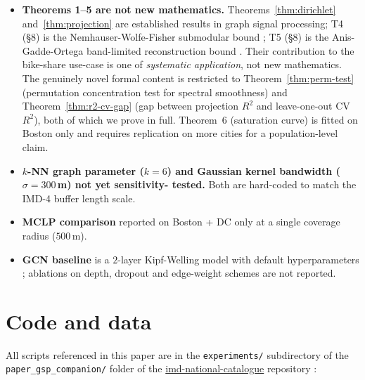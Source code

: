 \documentclass[11pt,a4paper]{article}
\newcommand{\1}{\mathbb{1}}
\theoremstyle{plain}
\theoremstyle{definition}
\theoremstyle{remark}
\begin{document}
\begin{itemize}[label=$\bullet$,leftmargin=*]
\item \textbf{Theorems 1--5 are not new mathematics.}
      Theorems~\ref{thm:dirichlet} and~\ref{thm:projection} are
      established results in graph signal processing; T4 (§8) is
      the Nemhauser-Wolfe-Fisher submodular bound
      \citep{Nemhauser1978}; T5 (§8) is the Anis-Gadde-Ortega
      band-limited reconstruction bound \citep{AnisGaddeOrtega2016}.
      Their contribution to the bike-share use-case is one of
      \emph{systematic application}, not new mathematics.  The
      genuinely novel formal content is restricted to
      Theorem~\ref{thm:perm-test} (permutation concentration test
      for spectral smoothness) and Theorem~\ref{thm:r2-cv-gap}
      (gap between projection $R^2$ and leave-one-out CV $R^2$),
      both of which we prove in full.  Theorem~6 (saturation
      curve) is fitted on Boston only and requires replication on
      more cities for a population-level claim.
\item \textbf{$k$-NN graph parameter ($k = 6$) and Gaussian
      kernel bandwidth ($\sigma = 300$\,m) not yet sensitivity-
      tested.}  Both are hard-coded to match the IMD-4 buffer
      length scale.
\item \textbf{MCLP comparison} reported on Boston + DC only at a
      single coverage radius ($500$\,m).
\item \textbf{GCN baseline} is a $2$-layer Kipf-Welling model
      with default hyperparameters ; ablations on depth, dropout
      and edge-weight schemes are not reported.
\end{itemize}

\section{Code and data}

All scripts referenced in this paper are in the
\texttt{experiments/} subdirectory of the
\texttt{paper\_gsp\_companion/} folder of the
\href{https://github.com/rohanfosse/imd-national-catalogue}{imd-national-catalogue}
repository :
\end{document}
